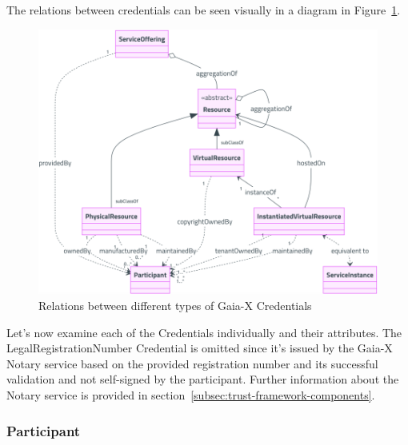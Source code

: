The relations between credentials can be seen visually in a diagram in Figure~\ref{fig:credential_relations}.

\begin{figure}
    \centering
    \includegraphics[width=\textwidth]{figures/credential-relations.png}
    \caption{Relations between different types of Gaia-X Credentials~\cite{gaiax_architecture_document}}\label{fig:credential_relations}
\end{figure}

Let's now examine each of the Credentials individually and their attributes.
The LegalRegistrationNumber Credential is omitted since it's issued by the Gaia-X Notary service based on the provided registration number and its successful validation and not self-signed by the participant.
Further information about the Notary service is provided in section~\ref{subsec:trust-framework-components}.

\subsubsection{Participant}

